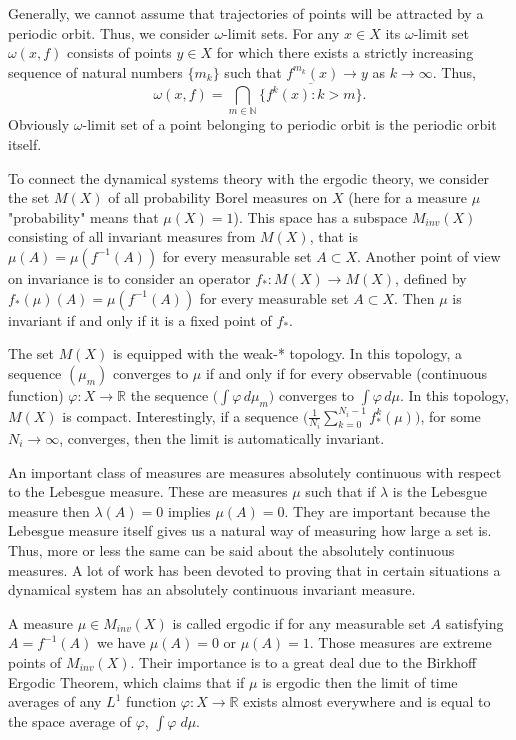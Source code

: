 \documentclass[format=acmsmall, authorversion, screen=true]{acmart}
\begin{document}
Generally, we cannot assume that trajectories of points will be attracted by a periodic orbit. Thus, we consider $\omega$-limit sets. For any $x\in X$ its $\omega$-limit set $\omega(x,f)$ consists of points $y\in X$ for which there exists a strictly increasing sequence of natural numbers $\{m_k\}$ such that $f^{m_k}(x)\to y$ as $k\to\infty$. Thus, \[\omega(x,f)=\bigcap_{m\in\mathbb{N}}\overline{\{f^k(x):k>m\}}.\]
Obviously $\omega$-limit set of a point belonging to periodic orbit is the periodic orbit itself.

To connect the dynamical systems theory with the ergodic theory, we consider the set $M(X)$ of all probability Borel measures on $X$ (here for a measure $\mu$ "probability" means that $\mu(X)=1$). This space has a subspace $M_{inv}(X)$ consisting of all invariant measures from $M(X)$, that is $\mu(A)=\mu(f^{-1}(A))$ for every measurable set $A\subset X$. Another point of view on invariance is to consider an operator $f_*:M(X)\to M(X)$, defined by $f_*(\mu)(A)=\mu(f^{-1}(A))$ for every measurable set $A\subset X$. Then $\mu$ is invariant if and only if it is a fixed point of $f_*$.

The set $M(X)$ is equipped with the weak-* topology. In this topology, a sequence $(\mu_m)$ converges to $\mu$ if and only if for every observable (continuous function) $\varphi\colon X\to\mathbb{R}$ the sequence $\big(\int\varphi \,d\mu_m\big)$ converges to $\int\varphi\,d\mu$. In this topology,
$M(X)$ is compact.
Interestingly, if a sequence $\big(\frac1{N_i}\sum_{k=0}^{N_i-1}f^k_*(\mu)\big)$, for some $N_i\to\infty$, converges, then the limit is automatically invariant.

An important class of measures are measures absolutely continuous with respect to the Lebesgue measure. These are measures $\mu$ such that if $\lambda$ is the Lebesgue measure then $\lambda(A)=0$ implies $\mu(A)=0$. They are important because the Lebesgue measure itself gives us a natural way of measuring how large a set is. Thus, more or less the same can be said about the absolutely continuous measures. A lot of work has been devoted to proving that in certain situations a dynamical system has an absolutely continuous invariant measure.

A measure $\mu\in M_{inv}(X)$ is called ergodic if for any measurable set $A$ satisfying $A=f^{-1}(A)$ we have $\mu(A)=0$ or $\mu(A)=1$. Those measures are extreme points of $M_{inv}(X)$. Their importance is to a great deal due to the Birkhoff Ergodic Theorem, which claims that if $\mu$ is ergodic then the limit of time averages of any $L^1$ function $\varphi\colon X\to\mathbb{R}$ exists almost everywhere and is equal to the space average of $\varphi$, $\int\varphi\;d\mu$.
\end{document}
